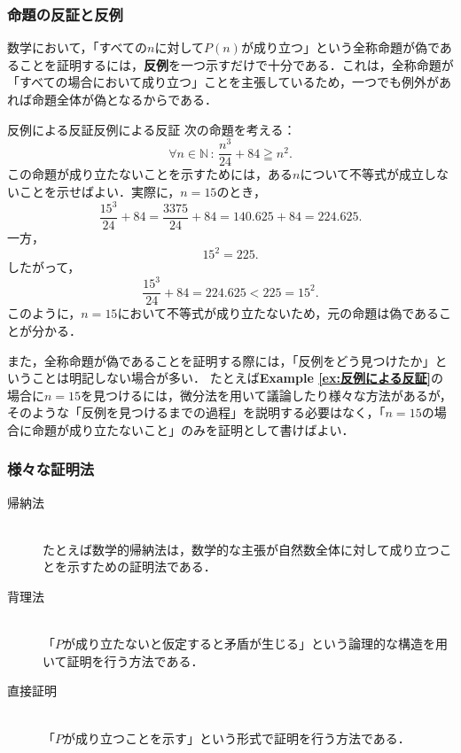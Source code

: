 \documentclass[a4paper,11pt]{ltjsarticle}
\newcommand{\exref}[1]{{\bfseries\sffamily Example \ref{ex:#1}}}
\renewcommand{\geq}{\geqq}
\begin{document}
\subsubsection{命題の反証と反例}

数学において，「すべての$n$に対して$P(n)$が成り立つ」という全称命題が偽であることを証明するには，\textbf{反例}を一つ示すだけで十分である．これは，全称命題が「すべての場合において成り立つ」ことを主張しているため，一つでも例外があれば命題全体が偽となるからである．

\begin{example}{反例による反証}{反例による反証}
  次の命題を考える：
  \[
    \forall n \in \mathbb{N}\, : \, \frac{n^3}{24} + 84 \geq n^2.
  \]
  この命題が成り立たないことを示すためには，ある$n$について不等式が成立しないことを示せばよい．実際に，$n = 15$のとき，
  \[
    \frac{15^3}{24} + 84 = \frac{3375}{24} + 84 = 140.625 + 84 = 224.625.
  \]
  一方，
  \[
    15^2 = 225.
  \]
  したがって，
  \[
    \frac{15^3}{24} + 84 = 224.625 < 225 = 15^2.
  \]
  このように，$n = 15$において不等式が成り立たないため，元の命題は偽であることが分かる．
\end{example}

また，全称命題が偽であることを証明する際には，「反例をどう見つけたか」ということは明記しない場合が多い．
たとえば\exref{反例による反証}の場合に$n=15$を見つけるには，微分法を用いて議論したり様々な方法があるが，そのような「反例を見つけるまでの過程」を説明する必要はなく，「$n=15$の場合に命題が成り立たないこと」のみを証明として書けばよい．

\subsubsection{様々な証明法}

\begin{description}
  \item[帰納法] \mbox{} \\
        たとえば数学的帰納法は，数学的な主張が自然数全体に対して成り立つことを示すための証明法である．
  \item[背理法] \mbox{} \\
        「$P$が成り立たないと仮定すると矛盾が生じる」という論理的な構造を用いて証明を行う方法である．
  \item[直接証明] \mbox{} \\
        「$P$が成り立つことを示す」という形式で証明を行う方法である．
\end{description}
\end{document}
